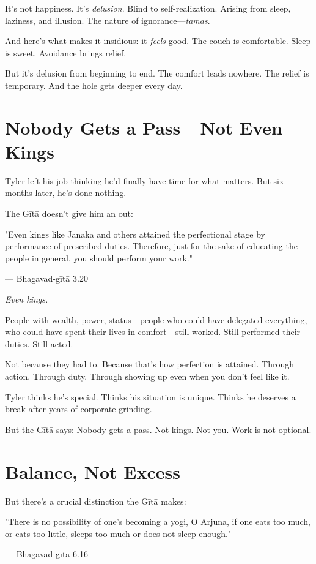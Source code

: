 \documentclass[11pt,twoside]{book}
\begin{document}
It's not happiness. It's \textit{delusion}. Blind to self-realization. Arising from sleep, laziness, and illusion. The nature of ignorance—\textit{tamas}.

And here's what makes it insidious: it \textit{feels} good. The couch is comfortable. Sleep is sweet. Avoidance brings relief.

But it's delusion from beginning to end. The comfort leads nowhere. The relief is temporary. And the hole gets deeper every day.

\section*{Nobody Gets a Pass—Not Even Kings}

Tyler left his job thinking he'd finally have time for what matters. But six months later, he's done nothing.

The Gītā doesn't give him an out:

\begin{pullquote}
"Even kings like Janaka and others attained the perfectional stage by performance of prescribed duties. Therefore, just for the sake of educating the people in general, you should perform your work."

--- Bhagavad-gītā 3.20
\end{pullquote}

\textit{Even kings.}

People with wealth, power, status—people who could have delegated everything, who could have spent their lives in comfort—still worked. Still performed their duties. Still acted.

Not because they had to. Because that's how perfection is attained. Through action. Through duty. Through showing up even when you don't feel like it.

Tyler thinks he's special. Thinks his situation is unique. Thinks he deserves a break after years of corporate grinding.

But the Gītā says: Nobody gets a pass. Not kings. Not you. Work is not optional.

\section*{Balance, Not Excess}

But there's a crucial distinction the Gītā makes:

\begin{pullquote}
"There is no possibility of one's becoming a yogi, O Arjuna, if one eats too much, or eats too little, sleeps too much or does not sleep enough."

--- Bhagavad-gītā 6.16
\end{pullquote}
\end{document}
